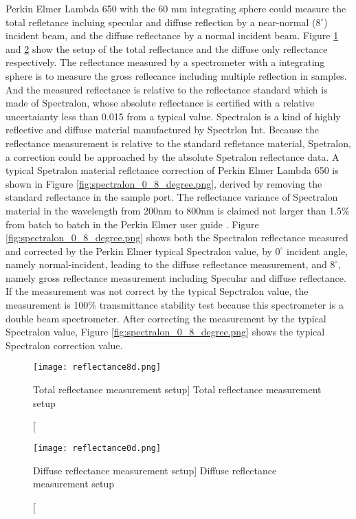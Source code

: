 Perkin Elmer Lambda 650 with the 60 mm integrating sphere could measure
the total refletance incluing specular and diffuse reflection by a near-normal ($8^\circ$) incident beam, and
the diffuse reflectance by a normal incident beam.
Figure \ref{fig:reflectance8d.png} and \ref{fig:reflectance0d.png} show the setup of the total reflectance and the diffuse only
reflectance respectively.
The reflectance measured by a spectrometer with a integrating sphere is to measure the gross reflecance including multiple reflection in samples.
And the measured reflectance is relative to the reflectance standard which is made of Spectralon, whose absolute reflectance is certified with
a relative uncertaianty less than 0.015 from a typical value. Spectralon is a kind of highly reflective and diffuse material manufactured by Spectrlon Int.
Because the reflectance measurement is relative to the standard refletance material, Spetralon,
a correction could be approached by the absolute Spetralon reflectance data.
A typical Spetralon material reflctance correction of Perkin Elmer Lambda 650 is
shown in Figure \ref{fig:spectralon_0_8_degree.png}, derived by removing the standard
reflectance in the sample port. The reflectance variance of Spectralon material in the wavelength from 200nm to 800nm
is claimed not larger than 1.5\% from batch to batch
in the Perkin Elmer user guide \cite{SphereAccessories}.
Figure \ref{fig:spectralon_0_8_degree.png} shows both the Spectralon reflectance measured and corrected by the Perkin Elmer typical Spectralon value,
by $0^\circ$ incident angle, namely normal-incident, leading to the diffuse reflectance measurement,
and $8^\circ$, namely gross reflectance measurement including Specular and diffuse reflectance.
If the measurement was not correct by the typical Sepctralon value, the measurement is 100\% transmittance stability test
because this spectrometer is a double beam spectrometer.
After correcting the measurement by the typical Spectralon value, Figure \ref{fig:spectralon_0_8_degree.png} shows the typical Spectralon correction value.


\begin{figure}
    \centering
    \texttt{[image: reflectance8d.png]}
    \caption
    [Total reflectance measurement setup]
    {Total reflectance measurement setup}
    \label{fig:reflectance8d.png}
    \end{figure}


\begin{figure}
    \centering
    \texttt{[image: reflectance0d.png]}
    \caption
    [Diffuse reflectance measurement setup]
    {Diffuse reflectance measurement setup}
    \label{fig:reflectance0d.png}
    \end{figure}


